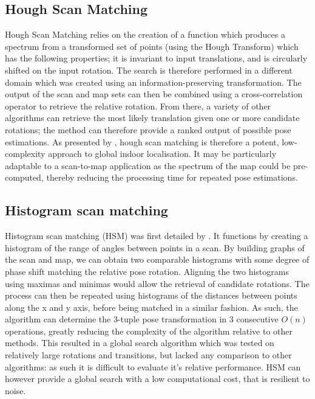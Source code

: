 \documentclass[authoryearcitations]{UoYCSproject}
\begin{document}
\subsection{Hough Scan Matching}
\label{subsec:hough}
Hough Scan Matching relies on the creation of a function which produces a spectrum from a transformed set of points (using the Hough Transform) which has the following properties; it is invariant to input translations, and is circularly shifted on the input rotation. The search is therefore performed in a different domain which was created using an information-preserving transformation. The output of the scan and map sets can then be combined using a cross-correlation operator to retrieve the relative rotation. From there, a variety of other algorithms can retrieve the most likely translation given one or more candidate rotations; the method can therefore provide a ranked output of possible pose estimations. As presented by \citet{Censi2005-iv}, hough scan matching is therefore a potent, low-complexity approach to global indoor localisation. It may be particularly adaptable to a scan-to-map application as the spectrum of the map could be pre-computed, thereby reducing the processing time for repeated pose estimations.

\subsection{Histogram scan matching}
Histogram scan matching (HSM) was first detailed by \citet{Weiss1994-ub}. It functions by creating a histogram of the range of angles between points in a scan. By building graphs of the scan and map, we can obtain two comparable histograms with some degree of phase shift matching the relative pose rotation. Aligning the two histograms using maximas and minimas would allow the retrieval of candidate rotations. The process can then be repeated using histograms of the distances between points along the x and y axis, before being matched in a similar fashion. As such, the algorithm can determine the 3-tuple pose transformation in 3 consecutive $O(n)$ operations, greatly reducing the complexity of the algorithm relative to other methods. This resulted in a global search algorithm which was tested on relatively large rotations and transitions, but lacked any comparison to other algorithms: as such it is difficult to evaluate it's relative performance. HSM can however provide a global search with a low computational cost, that is resilient to noise.

\color{red}
\end{document}
